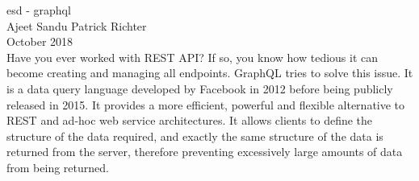 \documentclass{article}
\begin{document}
esd - graphql \\
Ajeet Sandu Patrick Richter\\
October 2018\\

Have you ever worked with REST API?
If so, you know how tedious it can become 
creating and managing all endpoints. 
GraphQL tries to solve this issue. It is a data query 
language developed by Facebook in 2012 before
being publicly released in 2015.
It provides a more efficient, powerful and flexible
alternative to REST and ad-hoc web service architectures.
It allows clients to define the structure of the data required, and exactly the same structure of the data is returned from the server, therefore preventing excessively large amounts of data from being returned.
\end{document}
